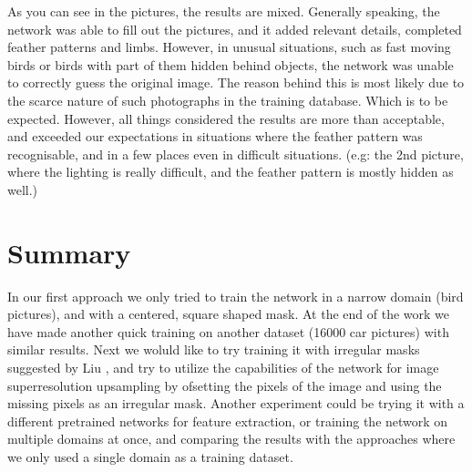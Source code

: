\documentclass[conference]{IEEEtran}
\begin{document}
As you can see in the pictures, the results are mixed. Generally speaking, the network was able to fill out the pictures, and it added relevant details, completed feather patterns and limbs. However, in unusual situations, such as fast moving birds or birds with part of them hidden behind objects, the network was unable to correctly guess the original image. 
The reason behind this is most likely due to the scarce nature of such photographs in the training database. Which is to be expected. 
However, all things considered the results are more than acceptable, and exceeded our expectations in situations where the feather pattern was recognisable, and in a few places even in difficult situations. (e.g: the 2nd picture, where the lighting is really difficult, and the feather pattern is mostly hidden as well.)

\section{Summary}

In our first approach we only tried to train the network in a narrow domain (bird pictures), and with a centered, square shaped mask. At the end of the work we have made another quick training on another dataset (16000 car pictures) with similar results. Next we woluld like to try training it with irregular masks suggested by Liu \cite{nvidia_paper}, and try to utilize the capabilities of the network for image superresolution upsampling by ofsetting the pixels of the image and using the missing pixels as an irregular mask. Another experiment could be trying it with a different pretrained networks for feature extraction, or training the network on multiple domains at once, and comparing the results with the approaches where we only used a single domain as a training dataset.
\end{document}
